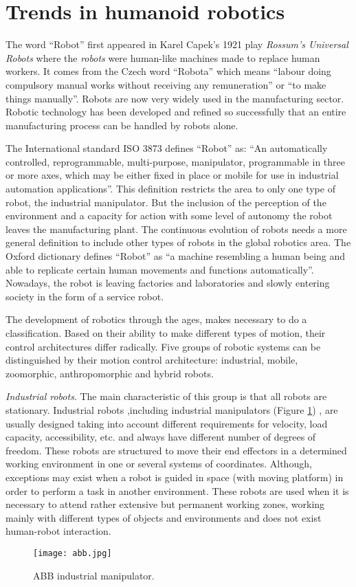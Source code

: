 \section{Trends in humanoid robotics}

The word ``Robot'' first appeared in Karel Capek's 1921 play \textit{Rossum's Universal Robots} where the \textit{robots} were human-like machines made to replace human workers. It comes from the Czech word ``Robota'' which means ``labour doing compulsory manual works without receiving any remuneration'' or ``to make things manually''. Robots are now very widely used in the manufacturing sector. Robotic technology has been developed and refined so successfully that an entire manufacturing process can be handled by robots alone.

The International standard ISO 3873 defines ``Robot'' as: ``An automatically controlled, reprogrammable, multi-purpose, manipulator, programmable in three or more axes, which may be either fixed in place or mobile for use in industrial automation applications''. This definition restricts the area to only one type of robot, the industrial manipulator. But the inclusion of the perception of the environment and a capacity for action with some level of autonomy the robot leaves the manufacturing plant. The continuous evolution of robots needs a more general definition to include other types of robots in the global robotics area. The Oxford dictionary defines ``Robot'' as ``a machine resembling a human being and able to replicate certain human movements and functions automatically''. Nowadays, the robot is leaving factories and laboratories and slowly entering society in the form of a service robot.

The development of robotics through the ages, makes necessary to do a classification. Based on their ability to make different types of motion, their control architectures differ radically. Five groups of robotic systems can be distinguished by their motion control architecture: industrial, mobile, zoomorphic, anthropomorphic and hybrid robots.

\textit{Industrial robots}. The main characteristic of this group is that all robots are stationary. Industrial robots ,including industrial manipulators (Figure \ref{fig:abb}) , are usually designed taking into account different requirements for velocity, load capacity, accessibility, etc. and always have different number of degrees of freedom. These robots are structured to move their end effectors in a determined working environment in one or several systems of coordinates. Although, exceptions may exist when a robot is guided in space (with moving platform) in order to perform a task in another environment. These robots are used when it is necessary to attend rather extensive but permanent working zones, working mainly with different types of objects and environments and does not exist human-robot interaction.
\begin{figure}[!hbt]
\centering
\texttt{[image: abb.jpg]}
\caption{ABB industrial manipulator.}
\label{fig:abb}
\end{figure}
 

